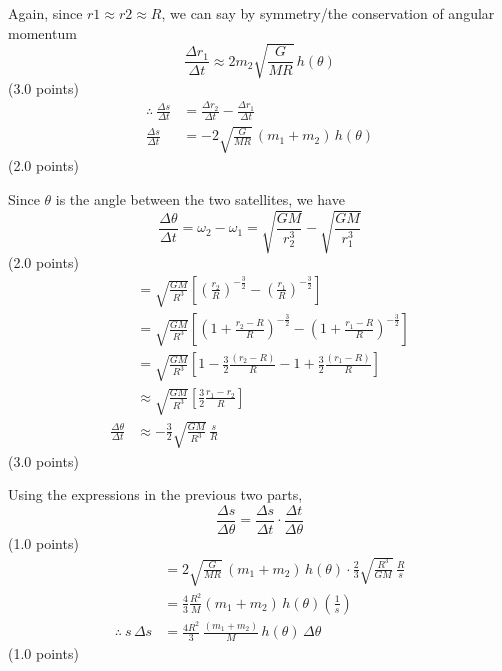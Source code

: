 \begin{description}
  Again, since $r1 \approx r2 \approx R$, we can say by symmetry/the %
  conservation of angular momentum
  \[
    \frac{\Delta r_1}{\Delta t} \approx 2m_2\sqrt{\frac{G}{MR}}\,h(\theta)
  \]
  \hfill(3.0 points)
  \begin{align*}
    \therefore\ \frac{\Delta s}{\Delta t}
      &= \frac{\Delta r_2}{\Delta t} - \frac{\Delta r_1}{\Delta t} \\
    \frac{\Delta s}{\Delta t}
      &= -2\sqrt{\frac{G}{MR}}\,(m_1 + m_2)\,h(\theta)
  \end{align*}
  \hfill(2.0 points)

\item[(e)] Since $\theta$ is the angle between the two satellites, we have
  \[
    \frac{\Delta\theta}{\Delta t} = \omega_2 - \omega_1
      = \sqrt{\frac{GM}{r_2^3}} - \sqrt{\frac{GM}{r_1^3}}
  \]
  \hfill(2.0 points)
  \begin{align*}
    &= \sqrt{\frac{GM}{R^3}}
       \left[\left(\frac{r_2}{R}\right)^{-\frac{3}{2}}
       - \left(\frac{r_1}{R}\right)^{-\frac{3}{2}}\right] \\
    &= \sqrt{\frac{GM}{R^3}}
       \left[\left(1 + \frac{r_2 - R}{R}\right)^{-\frac{3}{2}}
       - \left(1 + \frac{r_1 - R}{R}\right)^{-\frac{3}{2}}\right] \\
    &= \sqrt{\frac{GM}{R^3}}
       \left[1 - \frac{3}{2}\frac{(r_2 - R)}{R} - 1
       + \frac{3}{2}\frac{(r_1 - R)}{R}\right] \\
    &\approx \sqrt{\frac{GM}{R^3}}
       \left[\frac{3}{2}\frac{r_1 - r_2}{R}\right] \\
    \frac{\Delta\theta}{\Delta t}
    &\approx -\frac{3}{2}\sqrt{\frac{GM}{R^3}}\,\frac{s}{R}
  \end{align*}
  \hfill(3.0 points)

\item[(f)] Using the expressions in the previous two parts,
  \[
    \frac{\Delta s}{\Delta\theta}
      = \frac{\Delta s}{\Delta t}\cdot\frac{\Delta t}{\Delta\theta}
  \]
  \hfill(1.0 points)
  \begin{align*}
    &= 2\sqrt{\frac{G}{MR}}\,(m_1 + m_2)\,h(\theta)\cdot
       \frac{2}{3}\sqrt{\frac{R^3}{GM}}\,\frac{R}{s} \\
    &= \frac{4}{3}\frac{R^2}{M}(m_1 + m_2)\,h(\theta)
       \left(\frac{1}{s}\right) \\
    \therefore\ s\,\Delta s
    &= \frac{4R^2}{3}\,\frac{(m_1 + m_2)}{M}\,h(\theta)\,\Delta\theta
  \end{align*}
  \hfill(1.0 points)


\end{description}
